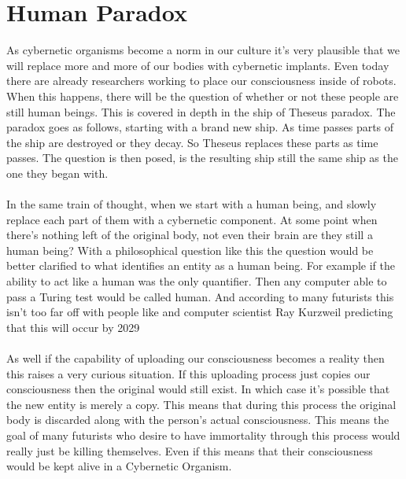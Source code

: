 \documentclass[12pt,a4paper,notitlepage]{article}
\begin{document}
\section{Human Paradox}
As cybernetic organisms become a norm in our culture it's very plausible that we
will replace more and more of our bodies with cybernetic implants. Even today
there are already researchers working to place our consciousness inside of
robots. When this happens, there will be the question of whether or not these
people are still human beings. This is covered in depth in the ship of Theseus
paradox\cite{Theseus}. The paradox goes as follows, starting with a brand new
ship. As time passes parts of the ship are destroyed or they decay. So Theseus
replaces these parts as time passes. The question is then posed, is the
resulting ship still the same ship as the one they began with. 
\\\\
In the same train of thought, when we start with a human being, and slowly
replace each part of them with a cybernetic component. At some point when
there's nothing left of the original body, not even their brain are they still a
human being? With a philosophical question like this the question would be
better clarified to what identifies an entity as a human being. For example if
the ability to act like a human was the only quantifier. Then any computer able
to pass a Turing test would be called human. And according to many futurists
this isn't too far off with people like and computer scientist Ray
Kurzweil predicting that this will occur by 2029\cite{Kurzweil}
\\\\
As well if the capability of uploading our consciousness becomes a reality then
this raises a very curious situation. If this uploading process just copies our
consciousness then the original would still exist. In which case it's possible
that the new entity is merely a copy. This means that during this process the
original body is discarded along with the person's actual consciousness. This
means the goal of many futurists who desire to have immortality through this
process would really just be killing themselves. Even if this means that their
consciousness would be kept alive in a Cybernetic Organism.
\end{document}
